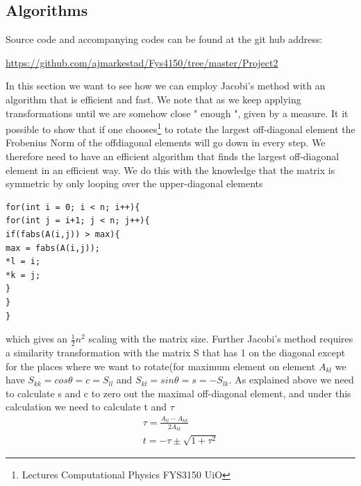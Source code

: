 \documentclass[a4paper,11pt]{article}
\begin{document}
{\subsection{Algorithms}

Source code and accompanying codes can be found at the git hub address:

\url{https://github.com/ajmarkestad/Fys4150/tree/master/Project2} 

In this section we want to see how we can employ Jacobi's method with an algorithm that is efficient and fast. We note that as we keep applying transformations until we are somehow close " enough ", given by a measure. It it possible to show that if one chooses\footnote{Lectures Computational Physics FYS3150 UiO} to rotate the largest off-diagonal element the Frobenius Norm of the offdiagonal elements will go down in every step. We therefore need to have an efficient algorithm that finds the largest off-diagonal element in an efficient way. We do this with the knowledge that the matrix is symmetric by only looping over the upper-diagonal elements
\begin{lstlisting}
for(int i = 0; i < n; i++){
for(int j = i+1; j < n; j++){
if(fabs(A(i,j)) > max){
max = fabs(A(i,j));
*l = i;
*k = j;
}
}
}
\end{lstlisting}
which gives an $\frac{1}{2}n^{2}$ scaling with the matrix size.  Further Jacobi's method requires a similarity transformation with the matrix S that has 1 on the diagonal except for the places where we want to rotate(for maximum element on element $A_{kl}$ we have $S_{kk}=cos \theta = c = S_{ll}$ and $S_{kl}=sin\theta = s = -S_{lk}$. As explained above we need to calculate s and c to zero out the maximal off-diagonal element, and under this calculation we need to calculate t and $\tau$
\begin{align}
\tau = \frac{A_{ll}-A_{kk}}{2A_{kl}}  \\
t = -\tau \pm \sqrt{1+\tau^2}
\end{align}

}
\end{document}
